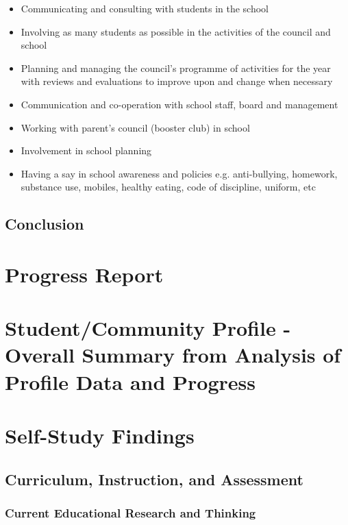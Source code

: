\documentclass{report}
\begin{document}
\begin{itemize}
\item Communicating and consulting with students in the school
\item Involving as many students as possible in the activities of the council and school
\item Planning and managing the council's programme of activities for the year with reviews and evaluations to improve upon and change when necessary
\item Communication and co-operation with school staff, board and management
\item Working with parent's council (booster club) in school
\item Involvement in school planning
\item Having a say in school awareness and policies e.g. anti-bullying, homework, substance use, mobiles, healthy eating, code of discipline, uniform, etc
\end{itemize}

\section{Conclusion}

\chapter{Progress Report}
\chapter[Student/Community Profile Summary]{Student/Community Profile - Overall Summary from Analysis of Profile Data and Progress}
\chapter{Self-Study Findings}

\section{Curriculum, Instruction, and Assessment}
\subsection{Current Educational Research and Thinking}
\end{document}
